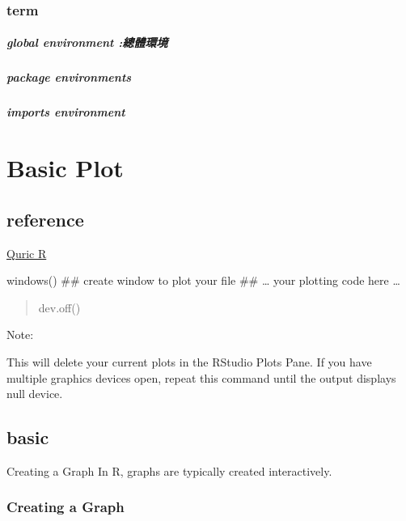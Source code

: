 \documentclass[]{book}
\let\oldparagraph\paragraph
\renewcommand{\paragraph}[1]{\oldparagraph{#1}\mbox{}}
\theoremstyle{definition}
\theoremstyle{definition}
\theoremstyle{definition}
\theoremstyle{remark}
\begin{document}
\subsection{term}\label{term}

\hypertarget{global-environment}{\paragraph{global environment
:總體環境}\label{global-environment}}

\paragraph{package environments}\label{package-environments}

\hypertarget{imports-environment}{\paragraph{imports
environment}\label{imports-environment}}

\chapter{Basic Plot}\label{basic-plot}

\section{reference}\label{reference-1}

\href{https://www.statmethods.net/graphs/creating.html}{Quric R}

windows() \#\# create window to plot your file \#\# \ldots{} your
plotting code here \ldots{}

\begin{quote}
dev.off()
\end{quote}

Note:

This will delete your current plots in the RStudio Plots Pane. If you
have multiple graphics devices open, repeat this command until the
output displays null device.

\section{basic}\label{basic}

Creating a Graph In R, graphs are typically created interactively.

\subsection{Creating a Graph}\label{creating-a-graph}
\end{document}
